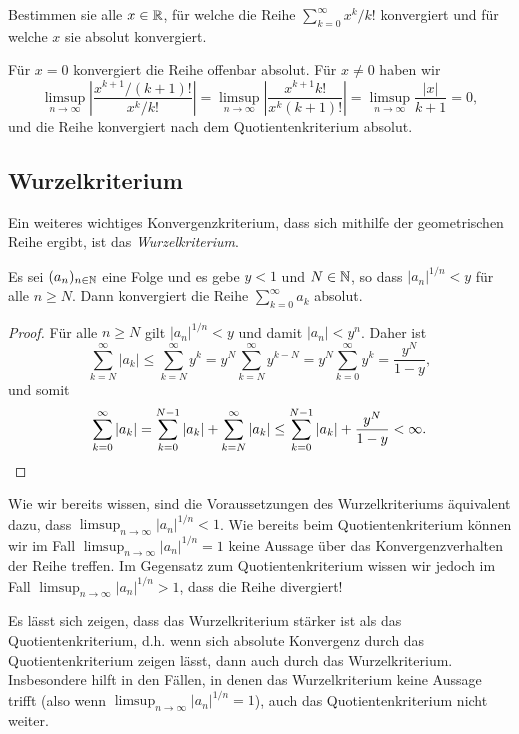 \documentclass[a4paper,10pt]{article}
\begin{document}
\begin{question}
 Bestimmen sie alle $x \in \mathbb{R}$, für welche die Reihe $\sum_{k=0}^\infty x^k/k!$ konvergiert und für welche $x$ sie absolut konvergiert.
\end{question}
\begin{solution}
 Für $x = 0$ konvergiert die Reihe offenbar absolut. Für $x \neq 0$ haben wir
 \[
  \limsup_{n \to \infty} \left| \frac{x^{k+1}/(k+1)!}{x^k/k!} \right|
  = \limsup_{n \to \infty} \left| \frac{x^{k+1} k!}{x^k (k+1)!} \right|
  = \limsup_{n \to \infty} \frac{|x|}{k+1}
  = 0,
 \]
 und die Reihe konvergiert nach dem Quotientenkriterium absolut.
\end{solution}





\subsection{Wurzelkriterium}

Ein weiteres wichtiges Konvergenzkriterium, dass sich mithilfe der geometrischen Reihe ergibt, ist das \emph{Wurzelkriterium}.

\begin{prop}
 Es sei $(a_n)_{n \in \mathbb{N}}$ eine Folge und es gebe $y < 1$ und $N \in \mathbb{N}$, so dass $|a_n|^{1/n} < y$ für alle $n \geq N$. Dann konvergiert die Reihe $\sum_{k=0}^\infty a_k$ absolut.
\end{prop}
\begin{proof}
 Für alle $n \geq N$ gilt $|a_n|^{1/n} < y$ und damit $|a_n| < y^n$. Daher ist
 \[
  \sum_{k=N}^\infty |a_k|
  \leq \sum_{k=N}^\infty y^k
  = y^N \sum_{k=N}^\infty y^{k-N}
  = y^N \sum_{k=0}^\infty y^k
  = \frac{y^N}{1-y},
 \]
 und somit
 \[
  \sum_{k=0}^\infty |a_k|
  = \sum_{k=0}^{N-1} |a_k| + \sum_{k=N}^\infty |a_k|
  \leq \sum_{k=0}^{N-1} |a_k| + \frac{y^N}{1-y}
  < \infty.
  \qedhere
 \]
\end{proof}

Wie wir bereits wissen, sind die Voraussetzungen des Wurzelkriteriums äquivalent dazu, dass $\limsup_{n \to \infty} |a_n|^{1/n} < 1$. Wie bereits beim Quotientenkriterium können wir im Fall $\limsup_{n \to \infty} |a_n|^{1/n} = 1$ keine Aussage über das Konvergenzverhalten der Reihe treffen. Im Gegensatz zum Quotientenkriterium wissen wir jedoch im Fall $\limsup_{n \to \infty} |a_n|^{1/n} > 1$, dass die Reihe divergiert!


\begin{bem}
 Es lässt sich zeigen, dass das Wurzelkriterium stärker ist als das Quotientenkriterium, d.h. wenn sich absolute Konvergenz durch das Quotientenkriterium zeigen lässt, dann auch durch das Wurzelkriterium. Insbesondere hilft in den Fällen, in denen das Wurzelkriterium keine Aussage trifft (also wenn $\limsup_{n \to \infty} |a_n|^{1/n} = 1$), auch das Quotientenkriterium nicht weiter.
\end{bem}
\end{document}
